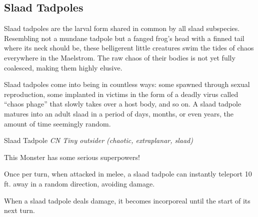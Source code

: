 \subsection{Slaad Tadpoles \cite{tadpole}}
Slaad tadpoles are the larval form shared in common by all slaad subspecies. Resembling not a mundane tadpole but a fanged frog’s head with a finned tail where its neck should be, these belligerent little creatures swim the tides of chaos everywhere in the Maelstrom. The raw chaos of their bodies is not yet fully coalesced, making them highly elusive.

Slaad tadpoles come into being in countless ways: some spawned through sexual reproduction, some implanted in victims in the form of a deadly virus called “chaos phage” that slowly takes over a host body, and so on. A slaad tadpole matures into an adult slaad in a period of days, months, or even years, the amount of time seemingly random.

\begin{monsterbox}{Slaad Tadpole}
	\textit{CN Tiny outsider (chaotic, extraplanar, slaad)}\\
	\hline
	\basics[%
	armorclass = 14,
	hitpoints  = 26,
	speed      = 10 ft
	]
	\hline
	\stats[
	STR = \stat{13}, %
	DEX = \stat{14},
	CON = \stat{12},
	INT = \stat{3},
	WIS = \stat{10},
	CHA = \stat{11}
	]
	\hline
	\details[%
	senses = {Darkvision 60 ft., Perception +7},
	languages = {Slaad},
	damageimmunities = {Sonic},
	damageresistances = {Acid, Cold, Elecricity, Fire},
	conditionimmunities = {Charmed},
	challenge = 2
	]
	\begin{monsteraction}
		This Monster has some serious superpowers!
	\end{monsteraction}
	\begin{monsteraction}
		Once per turn, when attacked in melee, a slaad tadpole can instantly teleport 10 ft. away in a random direction, avoiding damage.
	\end{monsteraction}

	\begin{monsteraction}[Fade (Su)]
	When a slaad tadpole deals damage, it becomes incorporeal until the start of its next turn.
	\end{monsteraction}
\end{monsterbox}
